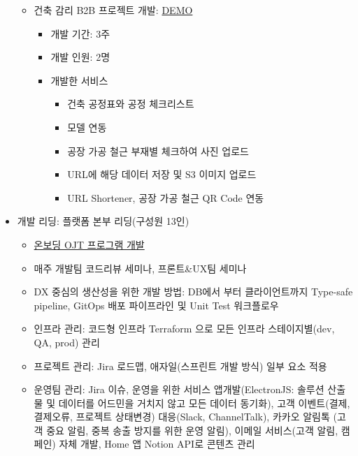 \begin{itemize}[label=]
\begin{itemize}[label=]
\begin{itemize}[label=]
		            \end{itemize}
		      \item 건축 감리 B2B 프로젝트 개발: \href{https://asec.builderhub.io/dashboard/detail/initial/supervision}{DEMO}
		            \begin{itemize}[label=]
			            \item 개발 기간: 3주
			            \item 개발 인원: 2명
			            \item 개발한 서비스
			                  \begin{itemize}
				                  \item 건축 공정표와 공정 체크리스트
				                  \item 모델 연동
				                  \item 공장 가공 철근 부재별 체크하여 사진 업로드
				                  \item URL에 해당 데이터 저장 및 S3 이미지 업로드
				                  \item URL Shortener, 공장 가공 철근 QR Code 연동
			                  \end{itemize}
		            \end{itemize}
	      \end{itemize}
	\item 개발 리딩: 플랫폼 본부 리딩(구성원 13인)
	      \begin{itemize}[label=]
		      \item \href{https://organization-pjk.gitbook.io/developer-ojt-program/}{온보딩 OJT 프로그램 개발}
		      \item 매주 개발팀 코드리뷰 세미나, 프론트\&UX팀 세미나
		      \item DX 중심의 생산성을 위한 개발 방법: DB에서 부터 클라이언트까지 Type-safe pipeline, GitOps 배포 파이프라인 및 Unit Test 워크플로우
		      \item 인프라 관리: 코드형 인프라 Terraform 으로 모든 인프라 스테이지별(dev, QA, prod) 관리
		      \item 프로젝트 관리: Jira 로드맵, 애자일(스프린트 개발 방식) 일부 요소 적용
		      \item 운영팀 관리: Jira 이슈, 운영을 위한 서비스 앱개발(ElectronJS: 솔루션 산출물 및 데이터를 어드민을 거치지 않고 모든 데이터 동기화), 고객 이벤트(결제, 결제오류, 프로젝트 상태변경) 대응(Slack, ChannelTalk), 카카오 알림톡 (고객 중요 알림, 중복
		            송출 방지를 위한 운영 알림), 이메일 서비스(고객 알림, 캠페인) 자체 개발, Home 앱 Notion API로 콘텐츠 관리

\end{itemize}
\end{itemize}
